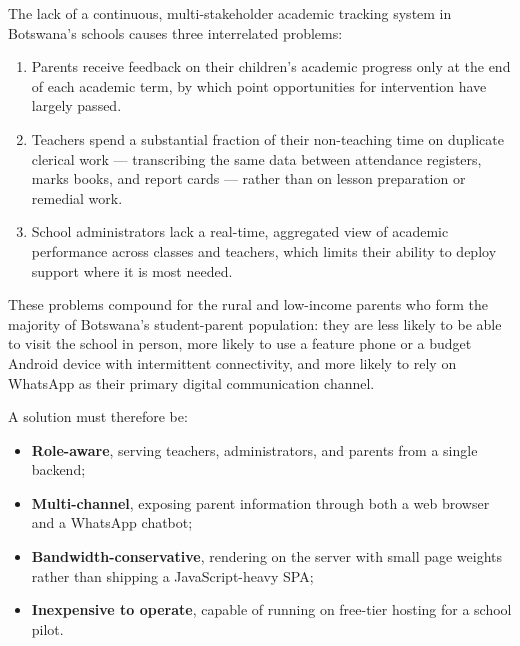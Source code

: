 \documentclass[11pt,a4paper]{article}
\begin{document}
The lack of a continuous, multi-stakeholder academic tracking system in
Botswana's schools causes three interrelated problems:

\begin{enumerate}[leftmargin=*]
    \item Parents receive feedback on their children's academic progress only
    at the end of each academic term, by which point opportunities for
    intervention have largely passed.

    \item Teachers spend a substantial fraction of their non-teaching time on
    duplicate clerical work --- transcribing the same data between attendance
    registers, marks books, and report cards --- rather than on lesson
    preparation or remedial work.

    \item School administrators lack a real-time, aggregated view of academic
    performance across classes and teachers, which limits their ability to
    deploy support where it is most needed.
\end{enumerate}

These problems compound for the rural and low-income parents who form the
majority of Botswana's student-parent population: they are less likely to be
able to visit the school in person, more likely to use a feature phone or a
budget Android device with intermittent connectivity, and more likely to rely
on WhatsApp as their primary digital communication channel.

A solution must therefore be:

\begin{itemize}[leftmargin=*]
    \item \textbf{Role-aware}, serving teachers, administrators, and parents
    from a single backend;
    \item \textbf{Multi-channel}, exposing parent information through both a
    web browser and a WhatsApp chatbot;
    \item \textbf{Bandwidth-conservative}, rendering on the server with small
    page weights rather than shipping a JavaScript-heavy SPA;
    \item \textbf{Inexpensive to operate}, capable of running on free-tier
    hosting for a school pilot.
\end{itemize}

\end{document}
